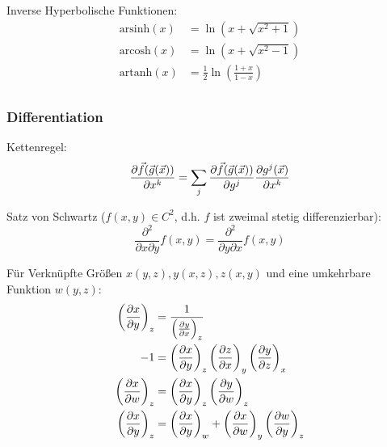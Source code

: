 \documentclass[11pt]{article}
\numberwithin{equation}{section}
\begin{document}
          Inverse Hyperbolische Funktionen:
          \begin{equation}
            \begin{aligned}
              \mathrm{arsinh}(x) &= \ln\left(x+\sqrt{x^2+1}\right) \\
              \mathrm{arcosh}(x) &= \ln\left(x+\sqrt{x^2-1}\right) \\
              \mathrm{artanh}(x) &= \frac{1}{2}\ln\left(\frac{1+x}{1-x}\right) \\
            \end{aligned}
          \end{equation}

  		\subsubsection{Differentiation}
        Kettenregel:
        \begin{equation}
          \frac{\partial \vec{f}(\vec{g}(\vec{x}))}{\partial x^k} = \sum_j \frac{\partial  \vec{f}(\vec{g}(\vec{x}))}{\partial g^j} \frac{\partial g^j(\vec{x})}{\partial x^k}
        \end{equation}

        Satz von Schwartz ($f(x,y)\in C^2$, d.h. $f$ ist zweimal stetig differenzierbar):
        \begin{equation}
          \frac{\partial^2 }{\partial x \partial y} f(x,y) = \frac{\partial^2 }{\partial y \partial x} f(x,y)
        \end{equation}

        Für Verknüpfte Größen $x(y,z), y(x,z), z(x,y)$ und eine umkehrbare Funktion $w(y,z)$:
        \begin{equation}
          \begin{aligned}
            \left( \frac{\partial x}{\partial y} \right)_z &= \frac{1}{\left( \frac{\partial y}{\partial x} \right)_z} \\
            -1 &= \left( \frac{\partial x}{\partial y} \right)_z \left( \frac{\partial z}{\partial x} \right)_y \left( \frac{\partial y}{\partial z} \right)_x \\
            \left( \frac{\partial x}{\partial w} \right)_z &= \left( \frac{\partial x}{\partial y} \right)_z \left( \frac{\partial y}{\partial w} \right)_z \\
            \left( \frac{\partial x}{\partial y} \right)_z &= \left( \frac{\partial x}{\partial y} \right)_w + \left( \frac{\partial x}{\partial w} \right)_y \left( \frac{\partial w}{\partial y} \right)_z \\
          \end{aligned}
        \end{equation}
\end{document}
